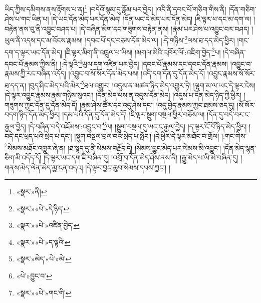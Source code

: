 \documentclass[12pt,a4paper]{book}
\begin{document}
ཡིད་ཀྱིས་དམིགས་ནས་རྟོགས་པ་ན།\footnote{«སྣར་»ནི།} །བདེའོ་སྙམ་དུ་རློམ་པར་བྱེད། །འདི་ནི་དབང་པོ་གཅིག་གིས་ནི། །དོན་གཅིག་ཤེས་པ་གང་ཡིན་པ། །དེ་ཡང་དོན་མེད་པར་དོན་མེད། །དོན་ཡང་དེ་མེད་པར་དོན་མེད། །ཇི་ལྟར་ཕ་དང་མ་དག་ལ། །བརྟེན་ནས་བུ་ནི་འབྱུང་བཤད་པ། །དེ་བཞིན་མིག་དང་གཟུགས་བརྟེན་ནས། །རྣམ་པར་ཤེས་པ་འབྱུང་བར་བཤད། །ཡུལ་ནི་འདས་དང་མ་འོངས་རྣམས། །དབང་པོ་དང་བཅས་དོན་མེད་ལ། །:དེ་གཉིས་\footnote{«སྣར་»«པེ་»དེ་ཉིད་}ལས་ཐ་དད་མེད་ཕྱིར། །གང་དག་ད་ལྟར་ཡང་དོན་མེད། །ཇི་ལྟར་མིག་ནི་འཁྲུལ་པ་ཡིས། །མགལ་མེའི་འཁོར་ལོ་:འཇིག་བྱེད་\footnote{«སྣར་»«པེ་»འཛིན་བྱེད་}པ། །དེ་བཞིན་དབང་པོ་རྣམས་ཀྱིས་ནི། །:དེ་ལྟའི་\footnote{«སྣར་»«པེ་»ད་ལྟའི་}ཡུལ་དག་འཛིན་པར་བྱེད། །དབང་པོ་རྣམས་དང་དབང་དོན་རྣམས། །འབྱུང་བ་རྣམས་ཀྱི་རང་བཞིན་འདོད། །འབྱུང་བ་སོ་སོར་དོན་མེད་པས། །འདི་དག་དོན་དུ་དོན་མེད་དོ། །འབྱུང་རྣམས་སོ་སོར་ཐ་དད་ན། །བུད་ཤིང་མེད་པའི་མེར་\footnote{«སྣར་»མེད་«པེ་»མེ་}ཐལ་འགྱུར། །འདུས་ན་མཚན་ཉིད་མེད་འགྱུར་ཏེ། །ལྷག་མ་ལ་ཡང་དེ་ལྟར་ངེས། །དེ་ལྟར་འབྱུང་རྣམས་རྣམ་གཉིས་སུའང་། །དོན་མེད་པས་ན་འདུས་དོན་མེད། །འདུས་པ་དོན་མེད་ཉིད་ཀྱི་ཕྱིར། །གཟུགས་ཀྱང་དོན་དུ་དོན་མེད་དོ། །རྣམ་ཤེས་ཚོར་དང་འདུ་ཤེས་དང་། །འདུ་བྱེད་རྣམས་ཀྱང་ཐམས་ཅད་དུ། །སོ་སོར་བདག་ཉིད་དོན་མེད་ཕྱིར། །དམ་པའི་དོན་དུ་དོན་མེད་དོ། །ཇི་ལྟར་སྡུག་བསྔལ་ཕྱིར་བཅོས་ལ། །དོན་དུ་བདེ་བར་ང་རྒྱལ་བྱེད། །དེ་བཞིན་བདེ་འཇོམས་:འབྱུང་བ་\footnote{«པེ་»བྱུང་བ་}ལ། །སྡུག་བསྔལ་དུ་ཡང་ང་རྒྱལ་བྱེད། །ད་ལྟར་ངོ་བོ་ཉིད་མེད་ཕྱིར། །བདེ་དང་ཕྲད་པའི་སྲེད་པ་དང་། །སྡུག་བསྔལ་བྲལ་བའི་སྲེད་པ་སྤོང་། །དེ་ཕྱིར་དེ་ལྟར་མཐོང་བ་གྲོལ། །:གང་གིས་\footnote{«སྣར་»«པེ་»གང་གི་}སེམས་མཐོང་འགྱུར་ཞེ་ན། །ཐ་སྙད་དུ་ནི་སེམས་བརྗོད་དེ། །སེམས་བྱུང་མེད་པར་སེམས་མི་འབྱུང་། །དོན་མེད་ལྷན་ཅིག་མི་འདོད་དོ། །དེ་ལྟར་ཡང་དག་ཇི་བཞིན་དུ། །འགྲོ་བ་དོན་མེད་ཤེས་ནས་ནི། །རྒྱུ་མེད་པ་ཡི་མེ་བཞིན་དུ། །གནས་མེད་ལེན་མེད་མྱ་ངན་འདའ། །དེ་ལྟར་བྱང་ཆུབ་སེམས་དཔས་ཀྱང་། །
\end{document}
